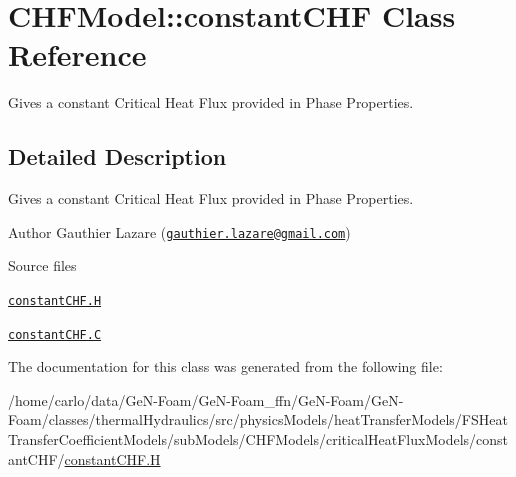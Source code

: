 \hypertarget{classFoam_1_1CHFModel_1_1constantCHF}{}\section{C\+H\+F\+Model\+:\+:constant\+C\+HF Class Reference}
\label{classFoam_1_1CHFModel_1_1constantCHF}


Gives a constant Critical Heat Flux provided in Phase Properties.  




\subsection{Detailed Description}
Gives a constant Critical Heat Flux provided in Phase Properties. 

\label{_Description}%
 Author Gauthier Lazare (\href{mailto:gauthier.lazare@gmail.com}{\tt gauthier.\+lazare@gmail.\+com})

\begin{DoxyParagraph}{Source files}

\begin{DoxyItemize}
\item \href{../../../home/carlo/data/GeN-Foam/GeN-Foam_ffn/GeN-Foam/GeN-Foam/classes/thermalHydraulics/src/physicsModels/heatTransferModels/FSHeatTransferCoefficientModels/subModels/CHFModels/criticalHeatFluxModels/constantCHF/constantCHF.H}{\tt constant\+C\+H\+F.\+H} 
\item \href{../../../home/carlo/data/GeN-Foam/GeN-Foam_ffn/GeN-Foam/GeN-Foam/classes/thermalHydraulics/src/physicsModels/heatTransferModels/FSHeatTransferCoefficientModels/subModels/CHFModels/criticalHeatFluxModels/constantCHF/constantCHF.C}{\tt constant\+C\+H\+F.\+C} 
\end{DoxyItemize}
\end{DoxyParagraph}


The documentation for this class was generated from the following file\+:\begin{DoxyCompactItemize}
\item 
/home/carlo/data/\+Ge\+N-\/\+Foam/\+Ge\+N-\/\+Foam\+\_\+ffn/\+Ge\+N-\/\+Foam/\+Ge\+N-\/\+Foam/classes/thermal\+Hydraulics/src/physics\+Models/heat\+Transfer\+Models/\+F\+S\+Heat\+Transfer\+Coefficient\+Models/sub\+Models/\+C\+H\+F\+Models/critical\+Heat\+Flux\+Models/constant\+C\+H\+F/\hyperlink{constantCHF_8H}{constant\+C\+H\+F.\+H}\end{DoxyCompactItemize}
